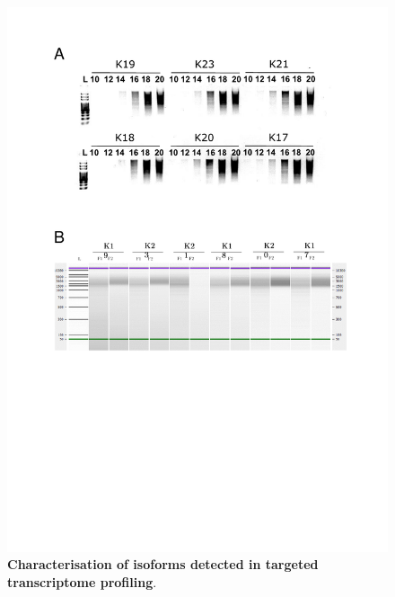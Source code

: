 \begin{figure}[htp]
	\centering
	\includegraphics[page=7,trim={0cm 1cm 0cm 0cm},clip,scale = 0.8]{Figures/TargetedTranscriptome_LabResults}
	\captionsetup{width=0.95\textwidth,singlelinecheck=off}
	\caption[Characterisation of isoforms detected in targeted transcriptome profiling]%
	{\textbf{Characterisation of isoforms detected in targeted transcriptome profiling}. 
	}
	\label{fig:Targeted_isoforms_annotate}
\end{figure}

